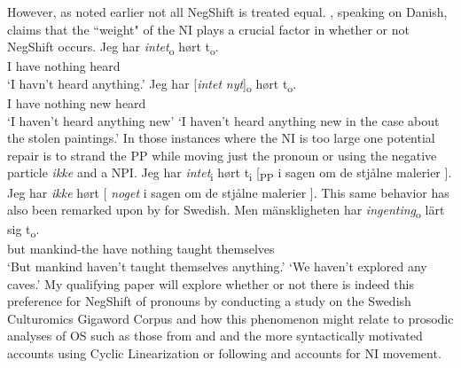\documentclass[12pt, letterpaper]{article}
\begin{document}
However, as noted earlier not all NegShift is treated equal. \citet[65f]{christensenInterfacesNegationSyntax2005}, speaking on Danish, claims that the ``weight" of the NI plays a crucial factor in whether or not NegShift occurs. 
	\ea
		\ea 
		\gll Jeg har \textit{intet}\textsubscript{o} hørt t\textsubscript{o}.\\
		I have nothing heard\\
		\glt  `I havn't heard anything.'
		\ex 
		\gll Jeg har [\textit{intet} \textit{nyt}]\textsubscript{o} hørt t\textsubscript{o}.\\
		I have nothing new heard\\
		\glt `I haven't heard anything new'
		\glt `I haven't heard anything new in the case about the stolen paintings.'
		\z 
	\z
In those instances where the NI is too large one potential repair is to strand the PP while moving just the pronoun or using the negative particle \textit{ikke} and a NPI.
	\ea 
		\ea Jeg har \textit{intet}\textsubscript{i} hørt t\textsubscript{i} [\textsubscript{PP} i sagen om de stjålne malerier ].
		\ex Jeg har \textit{ikke} hørt [ \textit{noget} i sagen om de stjålne malerier ].
		\z 
	\z   
This same behavior has also been remarked upon by \citet{penkaNegativeIndefinites2011} for Swedish.
	\ea 
		\ea 
		\gll Men mänskligheten har \textit{ingenting}\textsubscript{o} lärt sig t\textsubscript{o}.\\
		but mankind-the have nothing taught themselves\\
		\glt `But mankind haven't taught themselves anything.'
		\glt `We haven't explored any caves.'
		\z 
	\z 
My qualifying paper will explore whether or not there is indeed this preference for NegShift of pronouns by conducting a study on the Swedish Culturomics Gigaword Corpus \citep{eideSwedishCulturomicsGigaword2016} and how this phenomenon might relate to prosodic analyses of OS such as those from \citet{erteschik-shirVariationMainlandScandinavian2019} and \citet{brinkerhoffMATCHINGPhrasesNorwegian2020} and the more syntactically motivated accounts using Cyclic Linearization \citep{foxCyclicLinearizationSyntactic2005,engelsScandinavianNegativeIndefinites2012} or following \citet{zeijlstraSyntacticallyComplexStatus2011} and  accounts for NI movement.
\end{document}
